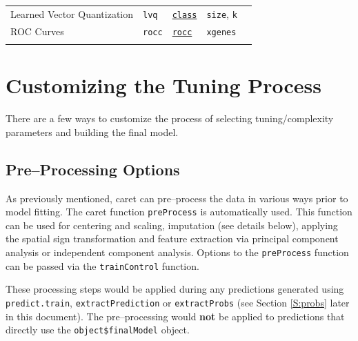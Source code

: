 \documentclass[12pt]{article}
\newcommand{\code}[1]{\mbox{\footnotesize\color{darkblue}\texttt{#1}}}
\newcommand{\pkg}[1]{{\fontseries{b}\selectfont #1}}
\renewcommand{\pkg}[1]{{\textsf{#1}}}
\begin{document}
\begin{landscape}
\begin{longtable}{lllll}
     
      Learned Vector  Quantization&
         \code{lvq} & 
             {\tt \href{http://cran.r-project.org/web/packages/class/index.html}{class}}       &          
            \code{size}, \code{k} & \\  
     
 \rowcolor[rgb]{.95, .95, .95}                 
      ROC Curves &
         \code{rocc} & 
             {\tt \href{http://cran.r-project.org/web/packages/rocc/index.html}{rocc}}    &          
            \code{xgenes} & \\                 
\label{label-name}
\end{longtable}
\end{landscape}
\pagestyle{fancy}


\section{Customizing the Tuning Process}

There are a few ways to customize the process of selecting
tuning/complexity parameters and building the final model.

\subsection{Pre--Processing Options}\label{S:pp}

As previously mentioned, \pkg{caret} can pre--process the data in
various ways prior to model fitting. The \pkg{caret} function
\code{preProcess} is automatically used. This function can be used
for centering and scaling, imputation (see details below),
applying the spatial sign transformation and feature extraction via
principal component analysis or independent component
analysis. Options to the \code{preProcess} function can be passed
via the \code{trainControl} function.  

These processing steps would be applied during any predictions
generated using \code{predict.train}, \code{extractPrediction} or
\code{extractProbs} (see Section \ref{S:probs}  later in this document). The
pre--processing would {\bf not} be applied to predictions that
directly use the \verb+object$finalModel+ object.  
\end{document}
